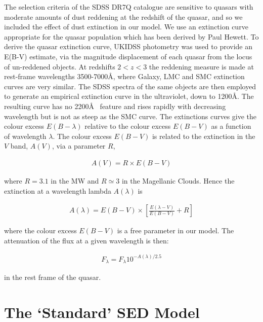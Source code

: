 The selection criteria of the SDSS DR7Q catalogue are sensitive to quasars with moderate amounts of dust reddening \citep[possibly as high as E(B-V) $\sim$ 0.5;][]{richards03} at the redshift of the quasar, and so we included the effect of dust extinction in our model. 
We use an extinction curve appropriate for the quasar population which has been derived by Paul Hewett. 
To derive the quasar extinction curve, UKIDSS photometry was used to provide an E(B-V) estimate, via the magnitude displacement of each quasar from the locus of un-reddened objects. 
At redshifts $2 < z < 3$ the reddening measure is made at rest-frame wavelengths 3500-7000\AA, where Galaxy, LMC and SMC extinction curves are very similar. 
The SDSS spectra of the same objects are then employed to generate an empirical extinction curve in the ultraviolet, down to 1200\AA. 
The resulting curve has no 2200\AA~ feature and rises rapidly with decreasing wavelength but is not as steep as the SMC curve. 
The extinctions curves give the colour excess $E(B-\lambda)$ relative to the colour excess $E(B-V)$ as a function of wavelength $\lambda$. 
The colour excess $E(B-V)$ is related to the extinction in the $V$ band, $A(V)$, via a parameter $R$, 

\begin{eqnarray}
  A(V) = R \times E(B -V )
\end{eqnarray}

where $R = 3.1$ in the MW and $R \simeq 3$ in the Magellanic Clouds. 
Hence the extinction at a wavelength lambda $A(\lambda)$ is 

\begin{eqnarray}
  A(\lambda) = E(B-V) \times \left[ \frac{E(\lambda-V)}{E(B-V)} + R \right] 
\end{eqnarray}

where the colour excess $E(B-V)$ is a free parameter in our model. 
The attenuation of the flux at a given wavelength is then:

\begin{eqnarray}
  F_\lambda = F_\lambda10^{-A(\lambda)/2.5}
\end{eqnarray}

in the rest frame of the quasar. 

\section{The `Standard' SED Model} 


